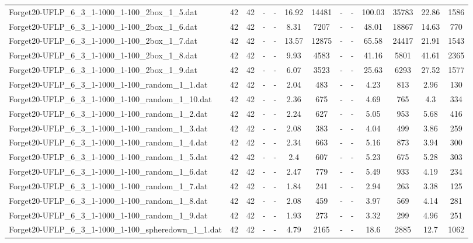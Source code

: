 \begin{table}[!ht]
{\begin{tabular}{lcccccccccccc}
Forget20-UFLP\_6\_3\_1-1000\_1-100\_2box\_1\_5.dat & 42 & 42 &  - &  - & 16.92 & 14481 &  - &  - & 100.03 & 35783 & 22.86 & 1586 \\
Forget20-UFLP\_6\_3\_1-1000\_1-100\_2box\_1\_6.dat & 42 & 42 &  - &  - & 8.31 & 7207 &  - &  - & 48.01 & 18867 & 14.63 & 770 \\
Forget20-UFLP\_6\_3\_1-1000\_1-100\_2box\_1\_7.dat & 42 & 42 &  - &  - & 13.57 & 12875 &  - &  - & 65.58 & 24417 & 21.91 & 1543 \\
Forget20-UFLP\_6\_3\_1-1000\_1-100\_2box\_1\_8.dat & 42 & 42 &  - &  - & 9.93 & 4583 &  - &  - & 41.16 & 5801 & 41.61 & 2365 \\
Forget20-UFLP\_6\_3\_1-1000\_1-100\_2box\_1\_9.dat & 42 & 42 &  - &  - & 6.07 & 3523 &  - &  - & 25.63 & 6293 & 27.52 & 1577 \\
Forget20-UFLP\_6\_3\_1-1000\_1-100\_random\_1\_1.dat & 42 & 42 &  - &  - & 2.04 & 483 &  - &  - & 4.23 & 813 & 2.96 & 130 \\
Forget20-UFLP\_6\_3\_1-1000\_1-100\_random\_1\_10.dat & 42 & 42 &  - &  - & 2.36 & 675 &  - &  - & 4.69 & 765 & 4.3 & 334 \\
Forget20-UFLP\_6\_3\_1-1000\_1-100\_random\_1\_2.dat & 42 & 42 &  - &  - & 2.24 & 627 &  - &  - & 5.05 & 953 & 5.68 & 416 \\
Forget20-UFLP\_6\_3\_1-1000\_1-100\_random\_1\_3.dat & 42 & 42 &  - &  - & 2.08 & 383 &  - &  - & 4.04 & 499 & 3.86 & 259 \\
Forget20-UFLP\_6\_3\_1-1000\_1-100\_random\_1\_4.dat & 42 & 42 &  - &  - & 2.34 & 663 &  - &  - & 5.16 & 873 & 3.94 & 300 \\
Forget20-UFLP\_6\_3\_1-1000\_1-100\_random\_1\_5.dat & 42 & 42 &  - &  - & 2.4 & 607 &  - &  - & 5.23 & 675 & 5.28 & 303 \\
Forget20-UFLP\_6\_3\_1-1000\_1-100\_random\_1\_6.dat & 42 & 42 &  - &  - & 2.47 & 779 &  - &  - & 5.49 & 933 & 4.19 & 234 \\
Forget20-UFLP\_6\_3\_1-1000\_1-100\_random\_1\_7.dat & 42 & 42 &  - &  - & 1.84 & 241 &  - &  - & 2.94 & 263 & 3.38 & 125 \\
Forget20-UFLP\_6\_3\_1-1000\_1-100\_random\_1\_8.dat & 42 & 42 &  - &  - & 2.08 & 459 &  - &  - & 3.97 & 569 & 4.14 & 281 \\
Forget20-UFLP\_6\_3\_1-1000\_1-100\_random\_1\_9.dat & 42 & 42 &  - &  - & 1.93 & 273 &  - &  - & 3.32 & 299 & 4.96 & 251 \\
Forget20-UFLP\_6\_3\_1-1000\_1-100\_spheredown\_1\_1.dat & 42 & 42 &  - &  - & 4.79 & 2165 &  - &  - & 18.6 & 2885 & 12.7 & 1062 \\

\end{tabular}}
\end{table}
